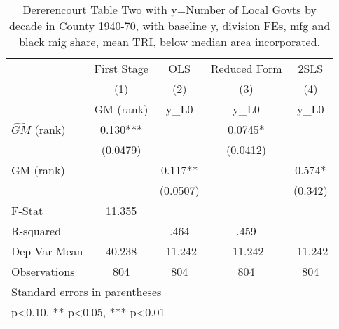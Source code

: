 \begin{table}[htbp]\centering
\def\sym#1{\ifmmode^{#1}\else\(^{#1}\)\fi}
\caption{Dererencourt Table Two with y=Number of Local Govts by decade in County 1940-70, with baseline y, division FEs, mfg and black mig share, mean TRI, below median area incorporated.}
\begin{tabular}{l*{4}{c}}
\toprule
                    & First Stage   &         OLS   &Reduced Form   &        2SLS   \\
                    &\multicolumn{1}{c}{(1)}&\multicolumn{1}{c}{(2)}&\multicolumn{1}{c}{(3)}&\multicolumn{1}{c}{(4)}\\
                    &\multicolumn{1}{c}{GM  (rank)}&\multicolumn{1}{c}{y\_L0}&\multicolumn{1}{c}{y\_L0}&\multicolumn{1}{c}{y\_L0}\\
\midrule
$\hat{GM}$ (rank)   &       0.130***&               &      0.0745*  &               \\
                    &    (0.0479)   &               &    (0.0412)   &               \\
\addlinespace
GM  (rank)          &               &       0.117** &               &       0.574*  \\
                    &               &    (0.0507)   &               &     (0.342)   \\
\midrule
F-Stat              &      11.355   &               &               &               \\
R-squared           &               &        .464   &        .459   &               \\
Dep Var Mean        &      40.238   &     -11.242   &     -11.242   &     -11.242   \\
Observations        &         804   &         804   &         804   &         804   \\
\bottomrule
\multicolumn{5}{l}{\footnotesize Standard errors in parentheses}\\
\multicolumn{5}{l}{\footnotesize * p<0.10, ** p<0.05, *** p<0.01}\\
\end{tabular}
\end{table}
